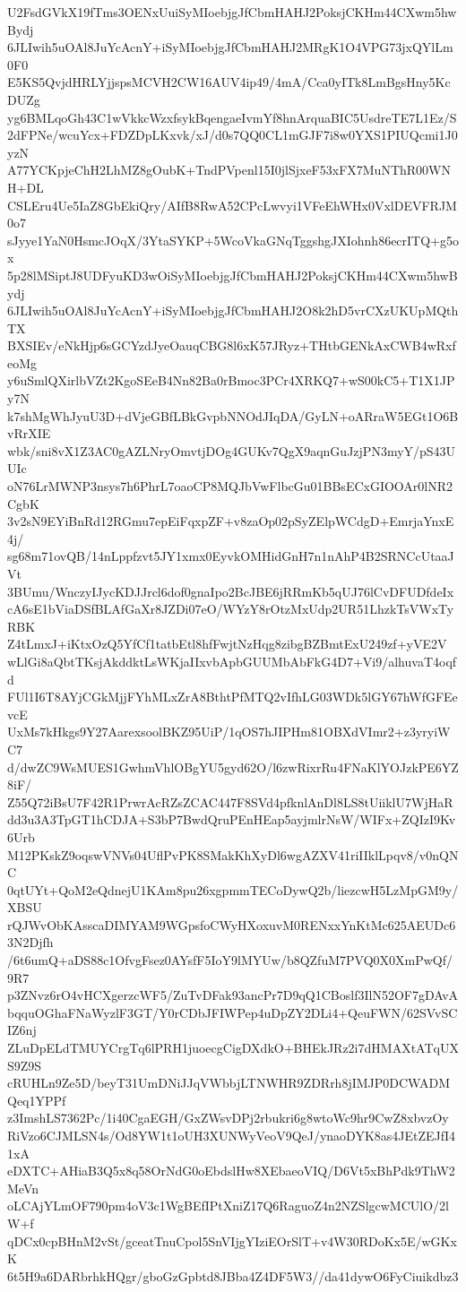 U2FsdGVkX19fTms3OENxUuiSyMIoebjgJfCbmHAHJ2PoksjCKHm44CXwm5hwBydj
6JLIwih5uOAl8JuYcAcnY+iSyMIoebjgJfCbmHAHJ2MRgK1O4VPG73jxQYlLm0F0
E5KS5QvjdHRLYjjspsMCVH2CW16AUV4ip49/4mA/Cca0yITk8LmBgsHny5KcDUZg
yg6BMLqoGh43C1wVkkcWzxfsykBqengaeIvmYf8hnArquaBIC5UsdreTE7L1Ez/S
2dFPNe/wcuYcx+FDZDpLKxvk/xJ/d0s7QQ0CL1mGJF7i8w0YXS1PIUQcmi1J0yzN
A77YCKpjeChH2LhMZ8gOubK+TndPVpenl15I0jlSjxeF53xFX7MuNThR00WNH+DL
CSLEru4Ue5IaZ8GbEkiQry/AIfB8RwA52CPcLwvyi1VFeEhWHx0VxlDEVFRJM0o7
sJyye1YaN0HsmcJOqX/3YtaSYKP+5WcoVkaGNqTggshgJXIohnh86ecrITQ+g5ox
5p28lMSiptJ8UDFyuKD3wOiSyMIoebjgJfCbmHAHJ2PoksjCKHm44CXwm5hwBydj
6JLIwih5uOAl8JuYcAcnY+iSyMIoebjgJfCbmHAHJ2O8k2hD5vrCXzUKUpMQthTX
BXSIEv/eNkHjp6sGCYzdJyeOauqCBG8l6xK57JRyz+THtbGENkAxCWB4wRxfeoMg
y6uSmlQXirlbVZt2KgoSEeB4Nn82Ba0rBmoc3PCr4XRKQ7+wS00kC5+T1X1JPy7N
k7shMgWhJyuU3D+dVjeGBfLBkGvpbNNOdJIqDA/GyLN+oARraW5EGt1O6BvRrXIE
wbk/sni8vX1Z3AC0gAZLNryOmvtjDOg4GUKv7QgX9aqnGuJzjPN3myY/pS43UUIc
oN76LrMWNP3nsys7h6PhrL7oaoCP8MQJbVwFlbcGu01BBsECxGIOOAr0lNR2CgbK
3v2sN9EYiBnRd12RGmu7epEiFqxpZF+v8zaOp02pSyZElpWCdgD+EmrjaYnxE4j/
sg68m71ovQB/14nLppfzvt5JY1xmx0EyvkOMHidGnH7n1nAhP4B2SRNCcUtaaJVt
3BUmu/WnczyIJycKDJJrcl6dof0gnaIpo2BcJBE6jRRmKb5qUJ76lCvDFUDfdeIx
cA6sE1bViaDSfBLAfGaXr8JZDi07eO/WYzY8rOtzMxUdp2UR51LhzkTsVWxTyRBK
Z4tLmxJ+iKtxOzQ5YfCf1tatbEtl8hfFwjtNzHqg8zibgBZBmtExU249zf+yVE2V
wLlGi8aQbtTKsjAkddktLsWKjaIIxvbApbGUUMbAbFkG4D7+Vi9/alhuvaT4oqfd
FUl1I6T8AYjCGkMjjFYhMLxZrA8BthtPfMTQ2vIfhLG03WDk5lGY67hWfGFEevcE
UxMs7kHkgs9Y27AarexsoolBKZ95UiP/1qOS7hJIPHm81OBXdVImr2+z3yryiWC7
d/dwZC9WsMUES1GwhmVhlOBgYU5gyd62O/l6zwRixrRu4FNaKlYOJzkPE6YZ8iF/
Z55Q72iBsU7F42R1PrwrAcRZsZCAC447F8SVd4pfknlAnDl8LS8tUiiklU7WjHaR
dd3u3A3TpGT1hCDJA+S3bP7BwdQruPEnHEap5ayjmlrNsW/WIFx+ZQIzI9Kv6Urb
M12PKskZ9oqswVNVs04UflPvPK8SMakKhXyDl6wgAZXV41riIIklLpqv8/v0nQNC
0qtUYt+QoM2eQdnejU1KAm8pu26xgpmmTECoDywQ2b/liezcwH5LzMpGM9y/XBSU
rQJWvObKAsscaDIMYAM9WGpsfoCWyHXoxuvM0RENxxYnKtMc625AEUDc63N2Djfh
/6t6umQ+aDS88c1OfvgFsez0AYsfF5IoY9lMYUw/b8QZfuM7PVQ0X0XmPwQf/9R7
p3ZNvz6rO4vHCXgerzcWF5/ZuTvDFak93ancPr7D9qQ1CBoslf3IlN52OF7gDAvA
bqquOGhaFNaWyzlF3GT/Y0rCDbJFIWPep4uDpZY2DLi4+QeuFWN/62SVvSCIZ6nj
ZLuDpELdTMUYCrgTq6lPRH1juoecgCigDXdkO+BHEkJRz2i7dHMAXtATqUXS9Z9S
cRUHLn9Ze5D/beyT31UmDNiJJqVWbbjLTNWHR9ZDRrh8jIMJP0DCWADMQeq1YPPf
z3ImshLS7362Pc/1i40CgaEGH/GxZWsvDPj2rbukri6g8wtoWc9hr9CwZ8xbvzOy
RiVzo6CJMLSN4s/Od8YW1t1oUH3XUNWyVeoV9QeJ/ynaoDYK8as4JEtZEJfI41xA
eDXTC+AHiaB3Q5x8q58OrNdG0oEbdslHw8XEbaeoVIQ/D6Vt5xBhPdk9ThW2MeVn
oLCAjYLmOF790pm4oV3c1WgBEfIPtXniZ17Q6RaguoZ4n2NZSlgcwMCUlO/2lW+f
qDCx0cpBHnM2vSt/gceatTnuCpol5SnVIjgYIziEOrSlT+v4W30RDoKx5E/wGKxK
6t5H9a6DARbrhkHQgr/gboGzGpbtd8JBba4Z4DF5W3//da41dywO6FyCiuikdbz3

